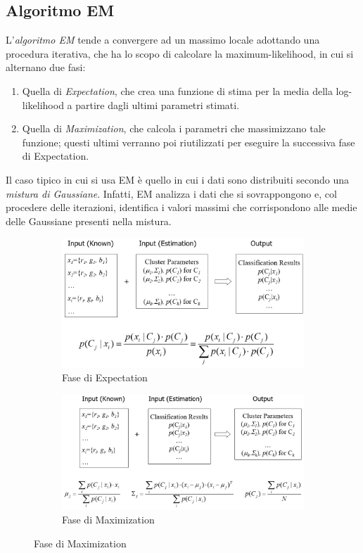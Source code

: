\documentclass[a4paper,oneside,titlepage]{book}
\begin{document}
\subsection{Algoritmo EM}
\label{EM}
L'\textit{algoritmo EM} tende a convergere ad un massimo locale adottando una procedura iterativa, che ha lo scopo di calcolare la maximum-likelihood, in cui si alternano due fasi:
\begin{enumerate}
    \item Quella di \textit{Expectation}, che crea una funzione di stima per la media della log-likelihood a partire dagli ultimi parametri stimati.
    \item Quella di \textit{Maximization}, che calcola i parametri che massimizzano tale funzione; questi ultimi verranno poi riutilizzati per eseguire la successiva fase di Expectation.
\end{enumerate}
Il caso tipico in cui si usa EM è quello in cui i dati sono distribuiti secondo una \textit{mistura di Gaussiane}. Infatti, EM analizza i dati che si sovrappongono e, col procedere delle iterazioni, identifica i valori massimi che corrispondono alle medie delle Gaussiane presenti nella mistura.
\begin{figure}[htp]
	\begin{subfigure}{0.49\textwidth}
	    \centering
		\includegraphics[width=\textwidth, height=\textheight, keepaspectratio]{em1.png}
		\caption{Fase di Expectation}
	\end{subfigure}
	\hfill
	\begin{subfigure}{0.49\textwidth}
	    \centering
		\includegraphics[width=\textwidth, height=\textheight, keepaspectratio]{em2.png}
		\caption{Fase di Maximization}
	\end{subfigure}
\end{figure}
\end{document}
